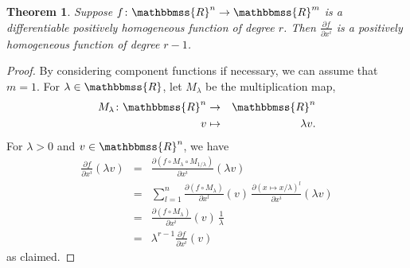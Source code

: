 \documentclass[12pt]{article}
\newcommand{\R}{\mathbbmss{R}}
\newtheorem{thm}{Theorem}
\begin{document}
\begin{thm} Suppose $f\colon \R^n\to \R^m$ is a differentiable
positively homogeneous function of degree $r$. 
Then $\frac{\partial f}{\partial x^i}$ is a 
positively homogeneous function of degree $r-1$.
\end{thm}


\begin{proof} By considering component functions if necessary, we can 
assume that $m=1$. 
For $\lambda\in \R$, let $M_\lambda$ be the 
multiplication map, 
\begin{eqnarray*}
M_\lambda\colon \R^n &\to& \R^n \\
                v&\mapsto& \lambda v.
\end{eqnarray*}
For $\lambda>0$ and $v\in \R^n$, we have
\begin{eqnarray*}
  \frac{\partial f}{\partial x^i}(\lambda v) &=&\frac{\partial(f\circ M_\lambda \circ M_{1/\lambda})}{\partial x^i}(\lambda v) \\
  &= &\sum_{l=1}^n\frac{\partial(f\circ M_\lambda)}{\partial x^l} (v)\, \frac{ \partial(x\mapsto x/\lambda)^l}{\partial x^i} (\lambda v) \\
  &= &\frac{\partial(f\circ M_\lambda)}{\partial x^i} (v)\, \frac{1}{\lambda}\\
  &= &\lambda^{r-1}\frac{\partial f}{\partial x^i} (v)
\end{eqnarray*}
as claimed.
\end{proof}
\end{document}
